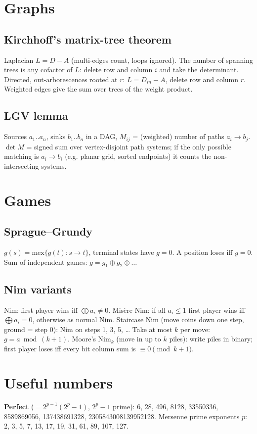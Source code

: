 \section{Graphs}
	\subsection{Kirchhoff's matrix-tree theorem}
		Laplacian $L = D - A$ (multi-edges count, loops ignored). The number of spanning trees is any cofactor of $L$:
		delete row and column $i$ and take the determinant. Directed, out-arborescences rooted at $r$:
		$L = D_{in} - A$, delete row and column $r$. Weighted edges give the sum over trees of the weight product.
	\subsection{LGV lemma}
		Sources $a_1..a_n$, sinks $b_1..b_n$ in a DAG, $M_{ij}$ = (weighted) number of paths $a_i \to b_j$.
		$\det M$ = signed sum over vertex-disjoint path systems; if the only possible matching is $a_i \to b_i$
		(e.g. planar grid, sorted endpoints) it counts the non-intersecting systems.

\section{Games}
	\subsection{Sprague--Grundy}
		$g(s) = \mathrm{mex}\{g(t) : s \to t\}$, terminal states have $g = 0$. A position loses iff $g = 0$.
		Sum of independent games: $g = g_1 \oplus g_2 \oplus \dots$
	\subsection{Nim variants}
		Nim: first player wins iff $\bigoplus a_i \ne 0$. Misère Nim: if all $a_i \le 1$ first player wins iff
		$\bigoplus a_i = 0$, otherwise as normal Nim. Staircase Nim (move coins down one step, ground = step 0): Nim on steps 1, 3, 5, \dots
		Take at most $k$ per move: $g = a \bmod (k + 1)$. Moore's Nim$_k$ (move in up to $k$ piles): write piles
		in binary; first player loses iff every bit column sum is $\equiv 0 \pmod{k+1}$.

\section{Useful numbers}
	\textbf{Perfect} ($= 2^{p-1}(2^p - 1)$, $2^p - 1$ prime): 6, 28, 496, 8128, 33550336, 8589869056, 137438691328, 2305843008139952128.
	Mersenne prime exponents $p$: 2, 3, 5, 7, 13, 17, 19, 31, 61, 89, 107, 127.

